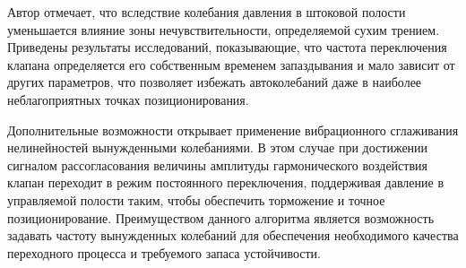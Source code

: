 Автор отмечает, что вследствие колебания давления в штоковой полости уменьшается влияние зоны нечувствительности,
определяемой сухим трением. Приведены результаты исследований, показывающие, что частота переключения клапана определяется
его собственным временем запаздывания и мало зависит от других параметров, что позволяет избежать автоколебаний даже
в наиболее неблагоприятных точках позиционирования.

Дополнительные возможности открывает применение вибрационного сглаживания нелинейностей вынужденными колебаниями.
В этом случае при достижении сигналом рассогласования величины амплитуды гармонического воздействия клапан переходит
в режим постоянного переключения, поддерживая давление в управляемой полости таким, чтобы обеспечить торможение и точное
позиционирование. Преимуществом данного алгоритма является возможность задавать частоту вынужденных колебаний для
обеспечения необходимого качества переходного процесса и требуемого запаса устойчивости.
